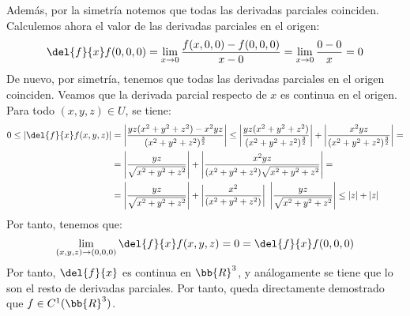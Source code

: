 \begin{ejercicio}
    Además, por la simetría notemos que todas las derivadas parciales coinciden. Calculemos ahora el valor de las derivadas parciales en el origen:
    \begin{equation*}
        \del{f}{x}f(0,0,0) = \lim_{x\to 0} \frac{f(x,0,0) - f(0,0,0)}{x-0} = \lim_{x\to 0} \frac{0-0}{x} = 0
    \end{equation*}
    De nuevo, por simetría, tenemos que todas las derivadas parciales en el origen coinciden. Veamos que la derivada parcial respecto de $x$ es continua en el origen. Para todo $(x,y,z)\in U$, se tiene:
    \begin{equation*}\begin{split}
        0\leq \left|\del{f}{x}f(x,y,z)\right| &= \left|\frac{yz(x^2+y^2+z^2) - x^2yz}{(x^2+y^2+z^2)^{\frac{3}{2}}}\right| \leq \left|\frac{yz(x^2+y^2+z^2)}{(x^2+y^2+z^2)^{\frac{3}{2}}}\right|+\left|\frac{x^2yz}{(x^2+y^2+z^2)^{\frac{3}{2}}}\right| =\\&
        = \left|\frac{yz}{\sqrt{x^2+y^2+z^2}}\right|+\left|\frac{x^2yz}{(x^2+y^2+z^2)\sqrt{x^2+y^2+z^2}}\right| =\\&
        = \left|\frac{yz}{\sqrt{x^2+y^2+z^2}}\right|+\left|\frac{x^2}{(x^2+y^2+z^2)}\right|~\left|\frac{yz}{\sqrt{x^2+y^2+z^2}}\right| \leq |z| + |z|
    \end{split}\end{equation*}
    Por tanto, tenemos que:
    \begin{equation*}
        \lim_{(x,y,z)\to (0,0,0)} \del{f}{x}f(x,y,z) = 0 = \del{f}{x}f(0,0,0)
    \end{equation*}
    Por tanto, $\del{f}{x}$ es continua en $\bb{R}^3$, y análogamente se tiene que lo son el resto de derivadas parciales. Por tanto, queda directamente demostrado que $f\in C^1(\bb{R}^3)$.
\end{ejercicio}

